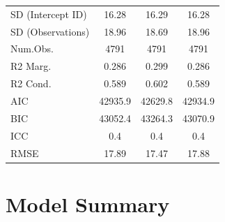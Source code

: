 \documentclass[]{report}
\begin{document}
\begin{table}
{\begin{tabular}[t]{lccc}
			SD (Intercept ID) & \num{16.28} & \num{16.29} & \num{16.28}\\
			SD (Observations) & \num{18.96} & \num{18.69} & \num{18.96}\\
			\midrule
			Num.Obs. & \num{4791} & \num{4791} & \num{4791}\\
			R2 Marg. & \num{0.286} & \num{0.299} & \num{0.286}\\
			R2 Cond. & \num{0.589} & \num{0.602} & \num{0.589}\\
			AIC & \num{42935.9} & \num{42629.8} & \num{42934.9}\\
			BIC & \num{43052.4} & \num{43264.3} & \num{43070.9}\\
			ICC & \num{0.4} & \num{0.4} & \num{0.4}\\
			RMSE & \num{17.89} & \num{17.47} & \num{17.88}\\
			\bottomrule
	\end{tabular}}
\end{table}



\chapter{Model Summary}
\end{document}
